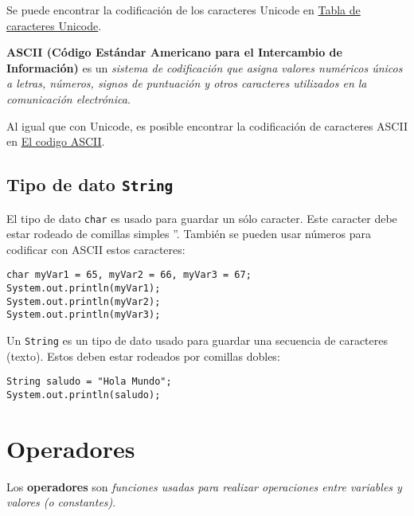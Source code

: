 \documentclass[12pt]{article}
\theoremstyle{largebreak}
\begin{document}
    Se puede encontrar la codificación de los caracteres Unicode en \href{https://symbl.cc/es/unicode-table/}{Tabla de caracteres Unicode}.

    \begin{mydef}
        \textbf{ASCII (Código Estándar Americano para el Intercambio de Información)} es un \textit{sistema de codificación que asigna valores numéricos únicos a letras, números, signos de puntuación y otros caracteres utilizados en la comunicación electrónica}.
    \end{mydef}

    Al igual que con Unicode, es posible encontrar la codificación de caracteres ASCII en \href{https://elcodigoascii.com.ar/}{El codigo ASCII}.

    \subsection{Tipo de dato \lstinline|String|}

    El tipo de dato \lstinline|char| es usado para guardar un sólo caracter. Este caracter debe estar rodeado de comillas simples ''. También se pueden usar números para codificar con ASCII estos caracteres:

    \begin{lstlisting}[caption={Declaración e impresión de variables tipo \lstinline|char|.},label=DescriptiveLabel]
char myVar1 = 65, myVar2 = 66, myVar3 = 67;
System.out.println(myVar1);
System.out.println(myVar2);
System.out.println(myVar3);
    \end{lstlisting}

    Un \lstinline|String| es un tipo de dato usado para guardar una secuencia de caracteres (texto). Estos deben estar rodeados por comillas dobles:

    \begin{lstlisting}[caption={Declaración e impresión de variable de tipo \lstinline|String|.},label=DescriptiveLabel]
String saludo = "Hola Mundo";
System.out.println(saludo);
    \end{lstlisting}

    \section{Operadores}

    \begin{mydef}
        Los \textbf{operadores} son \textit{funciones usadas para realizar operaciones entre variables y valores (o constantes)}.
    \end{mydef}
\end{document}
